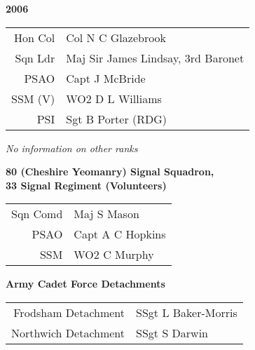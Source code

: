 \begin{center}
  \Huge
  \textbf{2006}
\end{center}

\begin{center}
  \small
  \begin{tabular}{rl}
    Hon Col & Col N C Glazebrook \\
    Sqn Ldr & Maj Sir James Lindsay, 3rd Baronet \\
    PSAO & Capt J McBride \\
    SSM (V) & WO2 D L Williams \\
    PSI & Sgt B Porter (RDG) \\
  \end{tabular}
\end{center}

\begin{center}
  \textit{No information on other ranks}
\end{center}

\begin{center}
  \Large
  \textbf{80 (Cheshire Yeomanry) Signal Squadron, \\ 33 Signal Regiment (Volunteers)}
\end{center}

\begin{center}
  \small
  \begin{tabular}{rl}
    Sqn Comd & Maj S Mason \\
    PSAO & Capt A C Hopkins \\
    SSM & WO2 C Murphy \\
  \end{tabular}
\end{center}

\begin{center}
  \Large
  \textbf{Army Cadet Force Detachments}
\end{center}

\begin{center}
  \small
  \begin{tabular}{rl}
    Frodsham Detachment & SSgt L Baker-Morris \\
    Northwich Detachment & SSgt S Darwin \\
  \end{tabular}
\end{center}

\vspace{50mm}

\pagebreak
